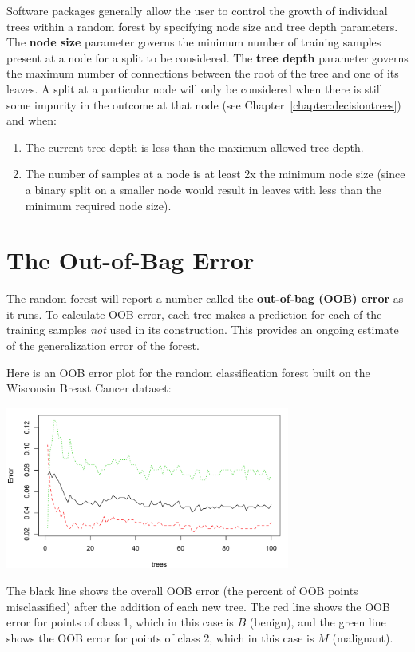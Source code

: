 Software packages generally allow the user to control the growth of individual trees within a random forest by specifying node size and tree depth parameters. The \textbf{node size} parameter governs the minimum number of training samples present at a node for a split to be considered. The \textbf{tree depth} parameter governs the maximum number of connections between the root of the tree and one of its leaves. A split at a particular node will only be considered when there is still some impurity in the outcome at that node (see Chapter~\ref{chapter:decisiontrees}) and when:
\begin{enumerate}
\item The current tree depth is less than the maximum allowed tree depth.
\item The number of samples at a node is at least 2x the minimum node size (since a binary split on a smaller node would result in leaves with less than the minimum required node size).
\end{enumerate}


\section{The Out-of-Bag Error}

The random forest will report a number called the \textbf{out-of-bag (OOB) error} as it runs. To calculate OOB error, each tree makes a prediction for each of the training samples \emph{not} used in its construction. This provides an ongoing estimate of the generalization error of the forest.

Here is an OOB error plot for the random classification forest built on the Wisconsin Breast Cancer dataset:

\begin{center}
\includegraphics[width=0.7\textwidth]{img/oob-classification-wisc.png}
\end{center}
The black line shows the overall OOB error (the percent of OOB points misclassified) after the addition of each new tree. The red line shows the OOB error for points of class 1, which in this case is $B$ (benign), and the green line shows the OOB error for points of class 2, which in this case is $M$ (malignant).

